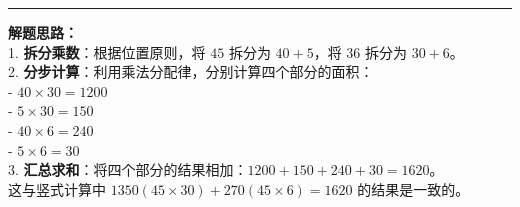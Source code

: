 \begin{center}
\begin{minipage}{0.55\textwidth}
  \end{minipage}
\end{center}

\vspace{1.0cm}
\hrule
\vspace{0.4cm}

{\small
\textbf{解题思路：} \\
1. \textbf{拆分乘数}：根据位置原则，将 $45$ 拆分为 $40 + 5$，将 $36$ 拆分为 $30 + 6$。 \\
2. \textbf{分步计算}：利用乘法分配律，分别计算四个部分的面积： \\
   - $40 \times 30 = 1200$ \\
   - $5 \times 30 = 150$ \\
   - $40 \times 6 = 240$ \\
   - $5 \times 6 = 30$ \\
3. \textbf{汇总求和}：将四个部分的结果相加：$1200 + 150 + 240 + 30 = 1620$。 \\
这与竖式计算中 $1350 (45 \times 30) + 270 (45 \times 6) = 1620$ 的结果是一致的。
}



